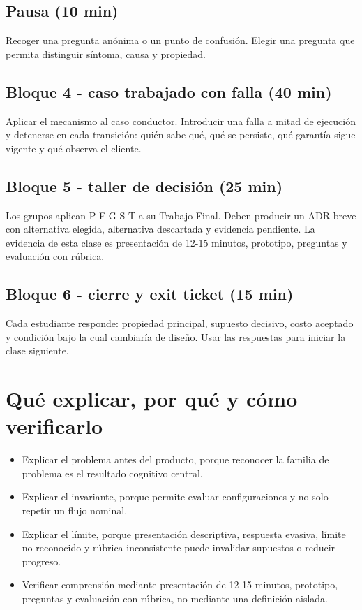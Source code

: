 \documentclass[variant=docente,cover=institutional,mode=screen]{ua-engineering-v6-article}
\begin{document}
\subsection*{Pausa (10 min)}
Recoger una pregunta anónima o un punto de confusión. Elegir una pregunta que permita distinguir síntoma, causa y propiedad.

\subsection*{Bloque 4 - caso trabajado con falla (40 min)}
Aplicar el mecanismo al caso conductor. Introducir una falla a mitad de ejecución y detenerse en cada transición: quién sabe qué, qué se persiste, qué garantía sigue vigente y qué observa el cliente.

\subsection*{Bloque 5 - taller de decisión (25 min)}
Los grupos aplican P-F-G-S-T a su Trabajo Final. Deben producir un ADR breve con alternativa elegida, alternativa descartada y evidencia pendiente. La evidencia de esta clase es presentación de 12-15 minutos, prototipo, preguntas y evaluación con rúbrica.

\subsection*{Bloque 6 - cierre y exit ticket (15 min)}
Cada estudiante responde: propiedad principal, supuesto decisivo, costo aceptado y condición bajo la cual cambiaría de diseño. Usar las respuestas para iniciar la clase siguiente.

\section{Qué explicar, por qué y cómo verificarlo}
\begin{itemize}
\item Explicar el problema antes del producto, porque reconocer la familia de problema es el resultado cognitivo central.
\item Explicar el invariante, porque permite evaluar configuraciones y no solo repetir un flujo nominal.
\item Explicar el límite, porque presentación descriptiva, respuesta evasiva, límite no reconocido y rúbrica inconsistente puede invalidar supuestos o reducir progreso.
\item Verificar comprensión mediante presentación de 12-15 minutos, prototipo, preguntas y evaluación con rúbrica, no mediante una definición aislada.
\end{itemize}
\end{document}
